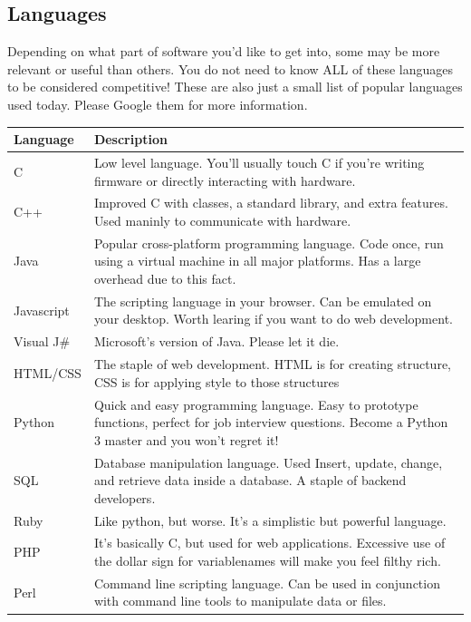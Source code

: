 \documentclass{article}
\begin{document}
\subsection{Languages}
 \hspace{0.5cm} Depending on what part of software you'd like to get into, some may be more relevant or useful than others. You do not need to know ALL of these languages to be considered competitive! These are also just a small list of popular languages used today. Please Google them for more information.\\
\begin{center}
\begin{tabular} {|p{3cm} |p{8cm}|}
\hline
\textbf{Language} & \textbf{Description}\\
\hline
C & Low level language. You'll usually touch C if you're writing firmware or directly interacting with hardware.\\ 
\hline
C++ & Improved C with classes, a standard library, and extra features. Used maninly to communicate with hardware.\\ 
\hline
Java & Popular cross-platform programming language. Code once, run using a virtual machine in all major platforms. Has a large overhead due to this fact.\\
\hline
Javascript & The scripting language in your browser. Can be emulated on your desktop. Worth learing if you want to do web development.\\
\hline
Visual J\# & Microsoft's version of Java. Please let it die.\\ 
\hline
HTML/CSS & The staple of web development. HTML is for creating structure, CSS is for applying style to those structures\\
\hline
Python & Quick and easy programming language. Easy to prototype functions, perfect for job interview questions. Become a Python 3 master and you won't regret it!\\
\hline
SQL & Database manipulation language. Used Insert, update, change, and retrieve data inside a database. A staple of backend developers.\\
\hline
Ruby & Like python, but worse. It's a simplistic but powerful language.\\
\hline
PHP & It's basically C, but used for web applications. Excessive use of the dollar sign for variablenames will make you feel filthy rich.\\
\hline
Perl & Command line scripting language. Can be used in conjunction with command line tools to manipulate data or files.\\

\end{tabular}
\end{center}
\end{document}
